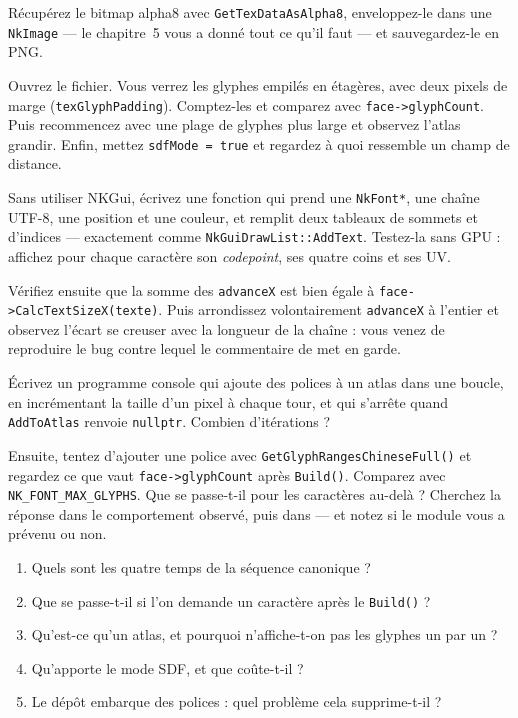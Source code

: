 \begin{nkdemo}
Récupérez le bitmap alpha8 avec \texttt{GetTexDataAsAlpha8}, enveloppez-le dans
une \texttt{NkImage} — le chapitre~5 vous a donné tout ce qu'il faut — et
sauvegardez-le en PNG.

Ouvrez le fichier. Vous verrez les glyphes empilés en étagères, avec deux pixels
de marge (\texttt{texGlyphPadding}). Comptez-les et comparez avec
\texttt{face->glyphCount}. Puis recommencez avec une plage de glyphes plus large
et observez l'atlas grandir. Enfin, mettez \texttt{sdfMode = true} et
regardez à quoi ressemble un champ de distance.
\end{nkdemo}

\begin{nkpratique}
Sans utiliser NKGui, écrivez une fonction qui prend une \texttt{NkFont*}, une
chaîne UTF-8, une position et une couleur, et remplit deux tableaux de sommets
et d'indices — exactement comme \texttt{NkGuiDrawList::AddText}. Testez-la sans
GPU : affichez pour chaque caractère son \emph{codepoint}, ses quatre coins et
ses UV.

Vérifiez ensuite que la somme des \texttt{advanceX} est bien égale à
\texttt{face->CalcTextSizeX(texte)}. Puis arrondissez volontairement
\texttt{advanceX} à l'entier et observez l'écart se creuser avec la longueur de
la chaîne : vous venez de reproduire le bug contre lequel le commentaire de
 met en garde.
\end{nkpratique}

\begin{nkdemo}
Écrivez un programme console qui ajoute des polices à un atlas dans une boucle,
en incrémentant la taille d'un pixel à chaque tour, et qui s'arrête quand
\texttt{AddToAtlas} renvoie \texttt{nullptr}. Combien d'itérations ?

Ensuite, tentez d'ajouter une police avec
\texttt{GetGlyphRangesChineseFull()} et regardez ce que vaut
\texttt{face->glyphCount} après \texttt{Build()}. Comparez avec
\texttt{NK\_FONT\_MAX\_GLYPHS}. Que se passe-t-il pour les caractères au-delà ?
Cherchez la réponse dans le comportement observé, puis dans
 — et notez si le module vous a prévenu ou non.
\end{nkdemo}

\begin{nkquestions}
\begin{enumerate}
\item Quels sont les quatre temps de la séquence canonique ?
\item Que se passe-t-il si l'on demande un caractère après le \texttt{Build()} ?
\item Qu'est-ce qu'un atlas, et pourquoi n'affiche-t-on pas les glyphes un par
      un ?
\item Qu'apporte le mode SDF, et que coûte-t-il ?
\item Le dépôt embarque des polices : quel problème cela supprime-t-il ?
\end{enumerate}
\end{nkquestions}

